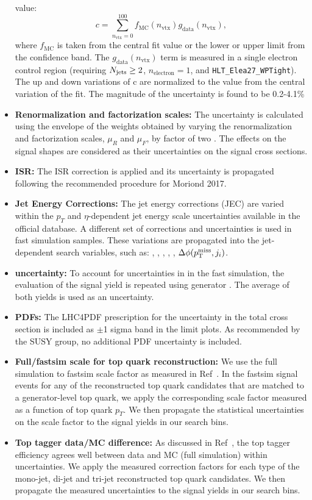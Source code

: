 \begin{itemize}
value:
\begin{equation}
c = \sum_{n_{\text{vtx}}=0}^{100} f_{\text{MC}}(n_{\text{vtx}})g_{\text{data}}(n_{\text{vtx}}) \label{eq:puacc-expval},
\end{equation}
where $f_{\text{MC}}$ is taken from the central fit value or the lower or upper limit from the confidence band.
The $g_{\text{data}}(n_{\text{vtx}})$ term is measured in a single electron control region (requiring $N_{\text{jets}}\geq2$, $n_{\text{electron}}=1$, and \texttt{HLT\_Elea27\_WPTight}).
The up and down variations of c are normalized to the value from the central variation of the fit. The magnitude of the uncertainty is found to be 0.2-4.1\%
\item {\bf Renormalization and factorization scales:} The uncertainty is calculated using the envelope of the weights obtained by varying the renormalization and factorization scales, $\mu_{R}$ and $\mu_{F}$, by factor of two \cite{Cacciari:2003fi,Catani:2003zt}. The effects on the signal shapes are considered as their uncertainties on the signal cross sections. %
\item {\bf ISR:} The ISR correction is applied and its uncertainty is propagated following the recommended procedure for Moriond 2017.
\item {\bf Jet Energy Corrections:} The jet energy corrections (JEC) are varied within the $p_{T}$ and $\eta$-dependent jet energy scale uncertainties available in the official database. A different set of corrections and uncertainties is used in fast simulation samples. These variations are propagated into the jet-dependent search variables, such as: \nbjets, \ntops, \MET, \MTTwo, \HT, $\Delta\phi(p^{\rm miss}_{\rm T},j_{i})$.
\item {\bf \MET uncertainty:} To account for uncertainties in \MET in the fast simulation, the evaluation of the signal yield is repeated using generator \MET. The average of both yields is used as an uncertainty.
\item {\bf PDFs:} The LHC4PDF\cite{Butterworth:2015oua} prescription for the uncertainty in the total cross section is included as $\pm$1 sigma band in the limit plots. As recommended by the SUSY group, no additional PDF uncertainty is included.
\item {\bf Full/fastsim scale for top quark reconstruction:} We use the full simulation to fastsim scale factor as measured in Ref~\cite{AN-16-461}. In the fastsim signal events for any of the reconstructed top quark candidates that are matched to a generator-level top quark, we apply the corresponding scale factor measured as a function of top quark $p_{T}$. We then propagate the statistical uncertainties on the scale factor to the signal yields in our search bins.
\item {\bf Top tagger data/MC difference:} As discussed in Ref~\cite{AN-16-461}, the top tagger efficiency agrees well between data and MC (full simulation) within uncertainties. We apply the measured correction factors for each type of the mono-jet, di-jet and tri-jet reconstructed top quark candidates. We then propagate the measured uncertainties to the signal yields in our search bins.
\end{itemize}

